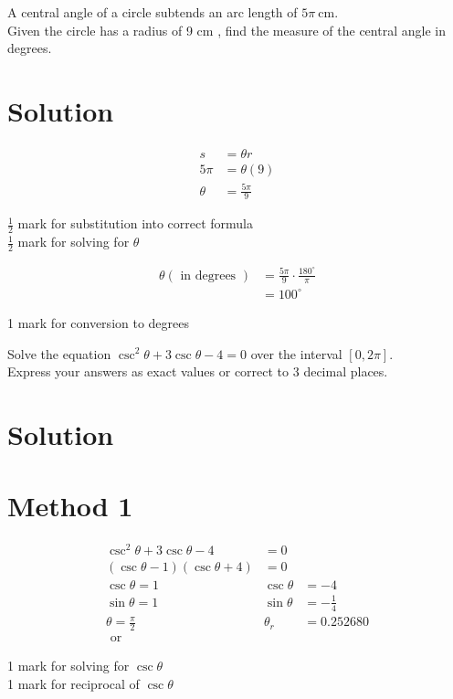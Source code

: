 \documentclass[10pt]{article}
\begin{document}
A central angle of a circle subtends an arc length of $5 \pi \mathrm{~cm}$.\\
Given the circle has a radius of 9 cm , find the measure of the central angle in degrees.

\section*{Solution}
$$
\begin{aligned}
s & =\theta r \\
5 \pi & =\theta(9) \\
\theta & =\frac{5 \pi}{9}
\end{aligned}
$$

$\frac{1}{2}$ mark for substitution into correct formula\\
$\frac{1}{2}$ mark for solving for $\theta$

$$
\begin{aligned}
\theta(\text { in degrees }) & =\frac{5 \pi}{9} \cdot \frac{180^{\circ}}{\pi} \\
& =100^{\circ}
\end{aligned}
$$

1 mark for conversion to degrees

Solve the equation $\csc ^{2} \theta+3 \csc \theta-4=0$ over the interval $[0,2 \pi]$.\\
Express your answers as exact values or correct to 3 decimal places.

\section*{Solution}
\section*{Method 1}
$$
\begin{array}{rlrl}
\csc ^{2} \theta+3 \csc \theta-4 & =0 \\
(\csc \theta-1)(\csc \theta+4) & =0 \\
\csc \theta=1 & \csc \theta & =-4 \\
\sin \theta=1 & \sin \theta & =-\frac{1}{4} \\
\theta=\frac{\pi}{2} & \theta_{r} & =0.252680 \\
\text { or } &
\end{array}
$$

1 mark for solving for $\csc \theta$\\
1 mark for reciprocal of $\csc \theta$
\end{document}
